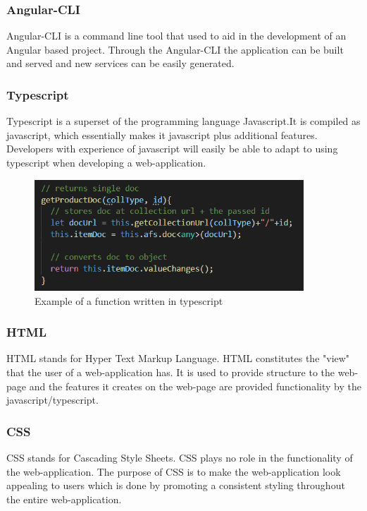 \subsubsection{Angular-CLI}
Angular-CLI is a command line tool that used to aid in the development of an Angular based project. Through the Angular-CLI the application can be built and served and new services can be easily generated.

\subsubsection{Typescript}
Typescript is a superset of the programming language Javascript.It is compiled as javascript, which essentially makes it javascript plus additional features. Developers with experience of javascript will easily be able to adapt to using typescript when developing a web-application.  

\begin{figure}[h!]
	\caption{Example of a function written in typescript}
	\centering
	\includegraphics[width=0.9\textwidth]{images/tscode.png}
\end{figure}

\subsubsection{HTML}
HTML stands for Hyper Text Markup Language. HTML constitutes the "view" that the user of a web-application has. It is used to provide structure to the web-page and the features it creates on the web-page are provided functionality by the javascript/typescript. 

\subsubsection{CSS}
CSS stands for Cascading Style Sheets. CSS plays no role in the functionality of the web-application. The purpose of CSS is to make the web-application look appealing to users which is done by promoting a consistent styling throughout the entire web-application.

